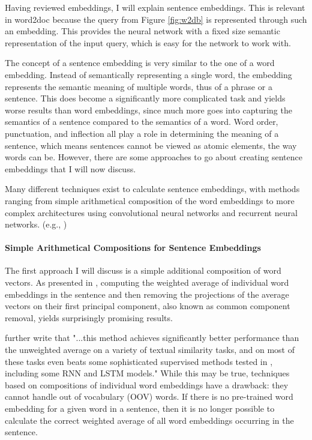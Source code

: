 Having reviewed embeddings, I will explain sentence embeddings. This is relevant in word2doc because the
query from Figure \ref{fig:w2db} is represented through such an embedding. This provides the neural network with a fixed
size semantic representation of the input query, which is easy for the network to work with.

The concept of a sentence embedding is very similar to the one of a word embedding. Instead of semantically
representing a single word, the embedding represents the semantic meaning of multiple words, thus of a phrase or a sentence. This does
become a significantly more complicated task and yields worse results than word embeddings, since much more goes into capturing the
semantics of a sentence compared to the semantics of a word. Word order, punctuation, and inflection all play a role in determining
the meaning of a sentence, which means sentences cannot be viewed as atomic elements, the way words can be.
However, there are some approaches to go about creating sentence embeddings that I will now discuss.

Many different techniques exist to calculate sentence embeddings, with methods ranging from simple arithmetical composition of the
word embeddings to more complex architectures using convolutional neural networks and recurrent neural networks.
(e.g., \citet{semb-eg1, skipthought, socher2011, blunsom2014, tai2015, wang2016})


\paragraph{Simple Arithmetical Compositions for Sentence Embeddings}

The first approach I will discuss is a simple additional composition of word vectors. As presented in \citet{semb-baseline},
computing the weighted average of individual word embeddings in the sentence and then removing the projections of the average vectors
on their first principal component, also known as common component removal, yields surprisingly promising results.

\citet{semb-baseline} further write that "...this method achieves significantly better performance than the unweighted
average on a variety of textual similarity tasks, and on most of these tasks even beats some sophisticated supervised methods tested
in \citet{wieting2016}, including some RNN and LSTM models." While this may be true, techniques based on compositions of
individual word embeddings have a drawback: they cannot handle out of vocabulary (OOV) words. If there is no pre-trained word
embedding for a given word in a sentence, then it is no longer possible to calculate the correct weighted average of all word
embeddings occurring in the sentence.

